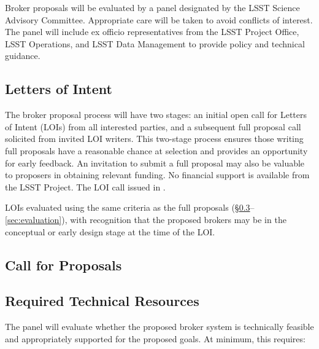 Broker proposals will be evaluated by a panel designated by the LSST Science Advisory Committee.  Appropriate care will be taken to avoid conflicts of interest.
The panel will include ex officio representatives from the LSST Project Office, LSST Operations, and LSST Data Management to provide policy and technical guidance.

\subsection{Letters of Intent} \label{sec:LOIs}

The broker proposal process will have two stages:
an initial open call for Letters of Intent (LOIs) from all interested parties, and a subsequent full proposal call solicited from invited LOI writers.
This two-stage process ensures those writing full proposals have a reasonable chance at selection and provides an opportunity for early feedback.
An invitation to submit a full proposal may also be valuable to proposers in obtaining relevant funding.
No financial support is available from the LSST Project.
The LOI call  issued in .

LOIs  evaluated using the same criteria as the full proposals (\S \ref{sec:resources}--\ref{sec:evaluation}), with recognition that the proposed brokers may be in the conceptual or early design stage at the time of the LOI.

\subsection{Call for Proposals} \label{sec:CfP}


\subsection{Required Technical Resources} \label{sec:resources}

The panel will evaluate whether the proposed broker system is technically feasible and appropriately supported for the proposed goals.
At minimum, this requires:

